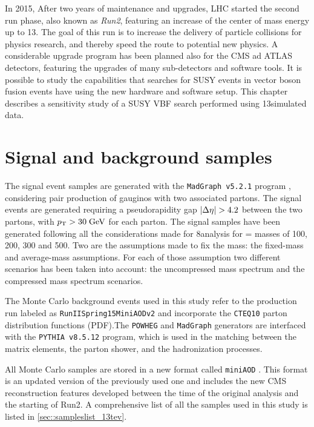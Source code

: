 

In 2015, After two years of maintenance and upgrades, LHC started the second run phase, also known as \textit{Run2}, featuring an increase of the center of mass energy up to 13\tev. The goal of this run is to increase the delivery of particle collisions for physics research, and thereby speed the route to potential new physics. A considerable upgrade program has been planned also for the CMS ad ATLAS detectors, featuring the upgrades of many sub-detectors and software tools. It is possible to study the capabilities that searches for SUSY events in vector boson fusion events have using the new hardware and software setup. This chapter describes a sensitivity study of a SUSY VBF search performed using 13\tev simulated data.

\section{Signal and background samples}

The signal event samples are generated with the \texttt{MadGraph v5.2.1} program \cite{Alwall:2011uj}, considering pair production of gauginos with two associated partons. The signal events are generated requiring a pseudorapidity gap $|\Delta\eta| > 4.2$ between the two partons, with $p_{\text{T}} > 30\;\text{Ge}\kern-0.06667em\text{V}$ for each parton. The signal samples have been generated following all the considerations made for 8\tev analysis for \charginopm = \neutralinotwo masses of 100, 200, 300 and 500\gev. Two are the assumptions made to fix the \stau mass: the fixed-mass and average-mass assumptions. For each of those assumption two different scenarios has been taken into account: the uncompressed mass spectrum and the compressed mass spectrum scenarios.

The Monte Carlo background events used in this study refer to the production run labeled as \texttt{RunIISpring15MiniAODv2} and incorporate the \texttt{CTEQ10} \cite{Dulat:2013hea} parton distribution functions (PDF).The \texttt{POWHEG} and \texttt{MadGraph} generators are interfaced with the \texttt{PYTHIA v8.5.12} \cite{Sjostrand:2006za} program, which is used in the matching between the matrix elements, the parton shower, and the hadronization processes. 

All Monte Carlo samples are stored in a new format called \texttt{miniAOD} \cite{bib:WorkBookMiniAOD}. This format is an updated version of the previously used one and includes the new CMS reconstruction features developed between the time of the original analysis and the starting of Run2. A comprehensive list of all the samples used in this study is listed in \autoref{sec::sampleslist_13tev}.

